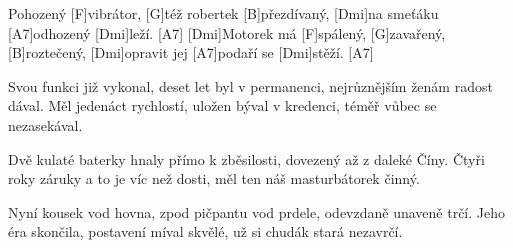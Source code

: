 
\sloka
[Dmi]Pohozený [F]vibrátor, [G]též robertek [B]přezdívaný,
[Dmi]na smeťáku [A7]odhozený [Dmi]leží. [A7]
[Dmi]Motorek má [F]spálený, [G]zavařený, [B]roztečený,
[Dmi]opravit jej [A7]podaří se [Dmi]stěží. [A7]

\sloka
Svou funkci již vykonal, deset let byl v permanenci,
nejrůznějším ženám radost dával.
Měl jedenáct rychlostí, uložen býval v kredenci,
téměř vůbec se nezasekával.

\sloka
Dvě kulaté baterky hnaly přímo k zběsilosti,
dovezený až z daleké Číny.
Čtyři roky záruky a to je víc než dosti,
měl ten náš masturbátorek činný.

\sloka
Nyní kousek vod hovna, zpod pičpantu vod prdele,
odevzdaně unaveně trčí.
Jeho éra skončila, postavení míval skvělé,
už si chudák stará nezavrčí. 
